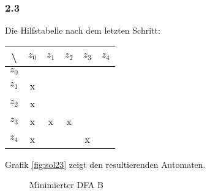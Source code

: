 \subsubsection*{2.3}
Die Hilfstabelle nach dem letzten Schritt:
\begin{table}[H]
    \centering
    \begin{tabular}{|c|c|c|c|c|c|}
        \hline %
            \textbackslash
            & $z_0$
            & $z_1$
            & $z_2$
            & $z_3$
            & $z_4$
            \\
        \hline %
            $z_0$
            & \cellcolor{gray}
            & \cellcolor{gray}
            & \cellcolor{gray}
            & \cellcolor{gray}
            & \cellcolor{gray}
            \\
        \hline %
            $z_1$
            & x
            & \cellcolor{gray}
            & \cellcolor{gray}
            & \cellcolor{gray}
            & \cellcolor{gray}
            \\
        \hline %
            $z_2$
            & x
            &
            & \cellcolor{gray}
            & \cellcolor{gray}
            & \cellcolor{gray}
            \\
        \hline %
            $z_3$
            & x
            & x
            & x
            & \cellcolor{gray}
            & \cellcolor{gray}
            \\
        \hline %
            $z_4$
            & x
            &
            &
            & x
            & \cellcolor{gray}
            \\
        \hline %
    \end{tabular}
    \label{tab:sol23}
\end{table}

Grafik \autoref{fig:sol23} zeigt den resultierenden Automaten.

\begin{figure}[ht] %
\centering %
\caption{Minimierter DFA B}
\label{fig:sol23}
\end{figure}

